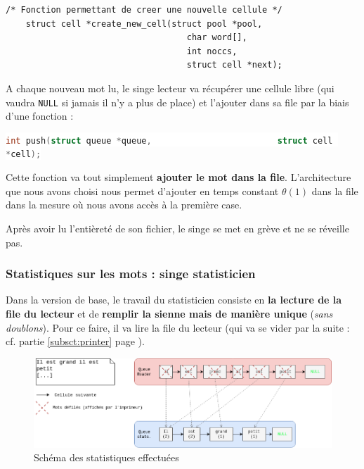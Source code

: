 \documentclass{article}
\newcommand{\inlinecode}[2]{\colorbox{white}{\lstinline[language=#1]$#2$}}
\begin{document}
\begin{lstlisting}
/* Fonction permettant de creer une nouvelle cellule */
    struct cell *create_new_cell(struct pool *pool,
                                    char word[],
                                    int noccs,
                                    struct cell *next);
\end{lstlisting}
\label{lst:code_create_new_cell}

A chaque nouveau mot lu, le singe lecteur va récupérer une cellule libre (qui vaudra \inlinecode{C}{NULL} si jamais il n'y a plus de place) et l'ajouter dans sa file par la biais d'une fonction :

\inlinecode{C}{int push(struct queue *queue,
                        struct cell *cell);}
\label{lst:push_explications}

Cette fonction va tout simplement \textbf{ajouter le mot dans la file}. L'architecture que nous avons choisi nous permet d'ajouter en temps constant $\theta(1)$ dans la file dans la mesure où nous avons accès à la première case.

Après avoir lu l'entièreté de son fichier, le singe se met en grève et ne se réveille pas.


\subsubsection{Statistiques sur les mots : singe statisticien}
\label{subsct:statisticien}

Dans la version de base, le travail du statisticien consiste en \textbf{la lecture de la file du lecteur} et de \textbf{remplir la sienne mais de manière unique} (\textit{sans doublons}). Pour ce faire, il va lire la file du lecteur (qui va se vider par la suite : cf. partie \ref{subsct:printer} page \pageref{subsct:printer}).

\begin{figure}[ht!]
\centering
\includegraphics[scale=0.37]{schemastats.png}
\caption{Schéma des statistiques effectuées}
\label{fig:schema_stats}
\end{figure}
\end{document}
